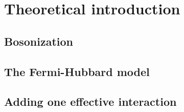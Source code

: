 \section{Theoretical introduction}

\todo

\subsection{Bosonization}

\todo

\subsection{The Fermi-Hubbard model}

\todo

\subsection{Adding one effective interaction}

\todo